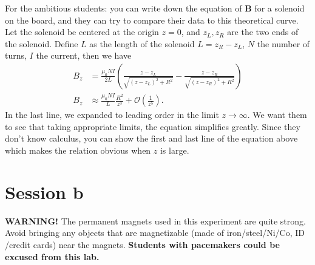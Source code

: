 \documentclass[12pt]{report}
\begin{document}
\begin{tcolorbox}
For the ambitious students: you can write down the equation of $\mathbf{B}$ for a solenoid on the board, and they can try to compare their data to this theoretical curve. Let the solenoid be centered at the origin $z=0$, and $z_L,z_R$ are the two ends of the solenoid. Define $L$ as the length of the solenoid $L=z_R-z_L$, $N$ the number of turns, $I$ the current, then we have
\begin{align}
B_z &=\frac{\mu_0 N I}{2 L} \left( \frac{z-z_L}{\sqrt{(z-z_L)^2+R^2}} - \frac{z-z_R}{\sqrt{(z-z_R)^2+R^2}} \right) \nonumber \\
B_z &\approx \frac{\mu_0 N I}{L} \frac{R^2}{z^3} + \mathcal{O}\left( \frac{1}{z^5}\right).
\end{align}
In the last line, we expanded to leading order in the limit $z\rightarrow \infty$. We want them to see that taking appropriate limits, the equation simplifies greatly. Since they don't know calculus, you can show the first and last line of the equation above which makes the relation obvious when $z$ is large.
\end{tcolorbox}



\section{Session b}
\Large{\textbf{WARNING!}} \normalsize The permanent magnets used in this experiment are quite strong. Avoid bringing any objects that are magnetizable (made of iron/steel/Ni/Co, ID /credit cards)  near the magnets. \textbf{Students with pacemakers could be excused from this lab.} \\
\end{document}
